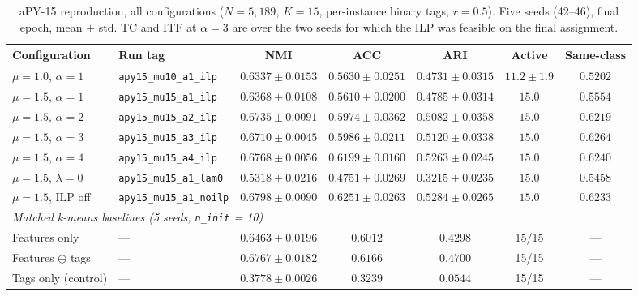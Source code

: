 \begin{table}[H]
    \centering
    \footnotesize
    \setlength{\tabcolsep}{4pt}
    \caption[Per-configuration aPY-15 reproduction results]{aPY-15 reproduction, all configurations ($N = 5{,}189$, $K = 15$, per-instance binary tags, $r = 0.5$). Five seeds (42--46), final epoch, mean $\pm$ std. TC and ITF at $\alpha = 3$ are over the two seeds for which the ILP was feasible on the final assignment.}
    \label{tab:c_apy_runs}
    \begin{tabular}{llccccc}
        \toprule
        \textbf{Configuration} & \textbf{Run tag} & \textbf{NMI} & \textbf{ACC} & \textbf{ARI} & \textbf{Active} & \textbf{Same-class} \\
        \midrule
        $\mu = 1.0$, $\alpha = 1$ & \texttt{apy15\_mu10\_a1\_ilp} & $0.6337 \pm 0.0153$ & $0.5630 \pm 0.0251$ & $0.4731 \pm 0.0315$ & $11.2 \pm 1.9$ & $0.5202$ \\
        $\mu = 1.5$, $\alpha = 1$ & \texttt{apy15\_mu15\_a1\_ilp} & $0.6368 \pm 0.0108$ & $0.5610 \pm 0.0200$ & $0.4785 \pm 0.0314$ & $15.0$ & $0.5554$ \\
        $\mu = 1.5$, $\alpha = 2$ & \texttt{apy15\_mu15\_a2\_ilp} & $0.6735 \pm 0.0091$ & $0.5974 \pm 0.0362$ & $0.5082 \pm 0.0358$ & $15.0$ & $0.6219$ \\
        $\mu = 1.5$, $\alpha = 3$ & \texttt{apy15\_mu15\_a3\_ilp} & $0.6710 \pm 0.0045$ & $0.5986 \pm 0.0211$ & $0.5120 \pm 0.0338$ & $15.0$ & $0.6264$ \\
        $\mu = 1.5$, $\alpha = 4$ & \texttt{apy15\_mu15\_a4\_ilp} & $0.6768 \pm 0.0056$ & $0.6199 \pm 0.0160$ & $0.5263 \pm 0.0245$ & $15.0$ & $0.6240$ \\
        $\mu = 1.5$, $\lambda = 0$ & \texttt{apy15\_mu15\_a1\_lam0} & $0.5318 \pm 0.0216$ & $0.4751 \pm 0.0269$ & $0.3215 \pm 0.0235$ & $15.0$ & $0.5458$ \\
        $\mu = 1.5$, ILP off & \texttt{apy15\_mu15\_a1\_noilp} & $0.6798 \pm 0.0090$ & $0.6251 \pm 0.0263$ & $0.5284 \pm 0.0265$ & $15.0$ & $0.6233$ \\
        \midrule
        \multicolumn{7}{l}{\textit{Matched k-means baselines (5 seeds, \texttt{n\_init} = 10)}} \\
        Features only & --- & $0.6463 \pm 0.0196$ & $0.6012$ & $0.4298$ & 15/15 & --- \\
        Features $\oplus$ tags & --- & $0.6767 \pm 0.0182$ & $0.6166$ & $0.4700$ & 15/15 & --- \\
        Tags only (control) & --- & $0.3778 \pm 0.0026$ & $0.3239$ & $0.0544$ & 15/15 & --- \\
        \bottomrule
    \end{tabular}
\end{table}


